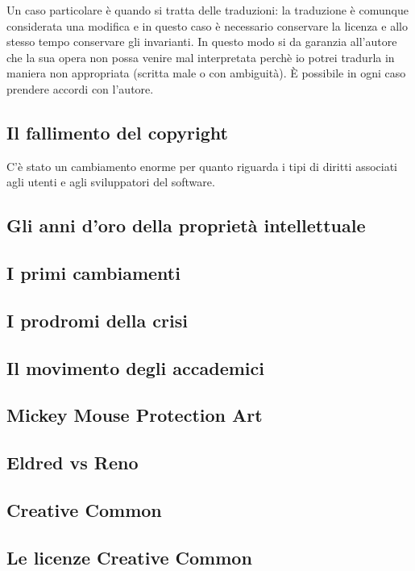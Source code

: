 Un caso particolare è quando si tratta delle traduzioni: la traduzione è comunque considerata una modifica e in questo caso è necessario conservare la licenza e allo stesso tempo conservare gli invarianti. In questo modo si da garanzia all'autore che la sua opera non possa venire mal interpretata perchè io potrei tradurla in maniera non appropriata (scritta male o con ambiguità). È possibile in ogni caso prendere accordi con l'autore.

\subsection{Il fallimento del copyright}

C'è stato un cambiamento enorme per quanto riguarda i tipi di diritti associati agli utenti e agli sviluppatori del software. 

\subsection{Gli anni d'oro della proprietà intellettuale}

\subsection{I primi cambiamenti}

\subsection{I prodromi della crisi}

\subsection{Il movimento degli accademici}

\subsection{Mickey Mouse Protection Art}

\subsection{Eldred vs Reno}

\subsection{Creative Common}

\subsection{Le licenze Creative Common}